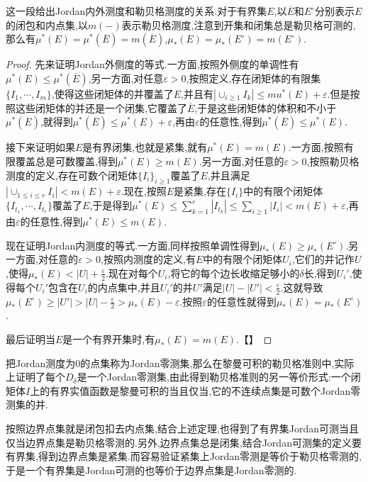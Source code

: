 这一段给出Jordan内外测度和勒贝格测度的关系.对于有界集$E$,以$\overline{E}$和$E^{\circ}$分别表示$E$的闭包和内点集,以$m(-)$表示勒贝格测度,注意到开集和闭集总是勒贝格可测的,那么有$\mu^*(E)=\mu^*(\overline{E})=m(\overline{E})$,$\mu_*(E)=\mu_*(E^{\circ})=m(E^{\circ})$.
\begin{proof}
	
	先来证明Jordan外侧度的等式.一方面,按照外侧度的单调性有$\mu^*(E)\le\mu^*(\overline{E})$,另一方面,对任意$\varepsilon>0$,按照定义,存在闭矩体的有限集$\{I_1,\cdots,I_m\}$,使得这些闭矩体的并覆盖了$E$,并且有$|\cup_{i\ge1}I_k|\le mu^*(E)+\varepsilon$.但是按照这些闭矩体的并还是一个闭集,它覆盖了$\overline{E}$,于是这些闭矩体的体积和不小于$\mu^*(\overline{E})$,就得到$\mu^*(\overline{E})\le\mu^*(E)+\varepsilon$,再由$\varepsilon$的任意性,得到$\mu^*(\overline{E})\le\mu^*(E)$.
	
	接下来证明如果$E$是有界闭集,也就是紧集,就有$\mu^*(E)=m(E)$.一方面,按照有限覆盖总是可数覆盖,得到$\mu^*(E)\ge m(E)$.另一方面,对任意的$\varepsilon>0$,按照勒贝格测度的定义,存在可数个闭矩体$\{I_i\}_{i\ge1}$覆盖了$E$,并且满足$|\cup_{1\le i\le r}I_i|< m(E)+\varepsilon$.现在,按照$E$是紧集,存在$\{I_i\}$中的有限个闭矩体$\{I_{t_1},\cdots,I_{t_r}\}$覆盖了$E$,于是得到$\mu^*(E)\le\sum_{k=1}^{r}|I_{t_k}|\le\sum_{i\ge1}|I_i|<m(E)+\varepsilon$,再由$\varepsilon$的任意性,得到$\mu^*(E)\le m(E)$.
	
	现在证明Jordan内测度的等式.一方面,同样按照单调性得到$\mu_*(E)\ge\mu_*(E^{\circ})$.另一方面,对任意的$\varepsilon>0$,按照内测度的定义,有$E$中的有限个闭矩体$U_i$,它们的并记作$U$,使得$\mu_*(E)<|U|+\frac{\varepsilon}{2}$.现在对每个$U_i$,将它的每个边长收缩足够小的$\delta$长,得到$U_i'$,使得每个$U_i'$包含在$U_i$的内点集中,并且$U_i'$的并$U'$满足$|U|-|U'|<\frac{\varepsilon}{2}$.这就导致$\mu_*(E^{\circ})\ge|U'|>|U|-\frac{\varepsilon}{2}>\mu_*(E)-\varepsilon$.按照$\varepsilon$的任意性就得到$\mu_*(E)=\mu_*(E^{\circ})$.
	
	最后证明当$E$是一个有界开集时,有$\mu_*(E)=m(E)$.【】
	
\end{proof}

把Jordan测度为0的点集称为Jordan零测集,那么在黎曼可积的勒贝格准则中,实际上证明了每个$D_{\delta}$是一个Jordan零测集,由此得到勒贝格准则的另一等价形式:一个闭矩体$I$上的有界实值函数是黎曼可积的当且仅当,它的不连续点集是可数个Jordan零测集的并.

按照边界点集就是闭包扣去内点集,结合上述定理,也得到了有界集Jordan可测当且仅当边界点集是勒贝格零测的.另外,边界点集总是闭集,结合Jordan可测集的定义要有界集,得到边界点集是紧集.而容易验证紧集上Jordan零测是等价于勒贝格零测的,于是一个有界集是Jordan可测的也等价于边界点集是Jordan零测的.

